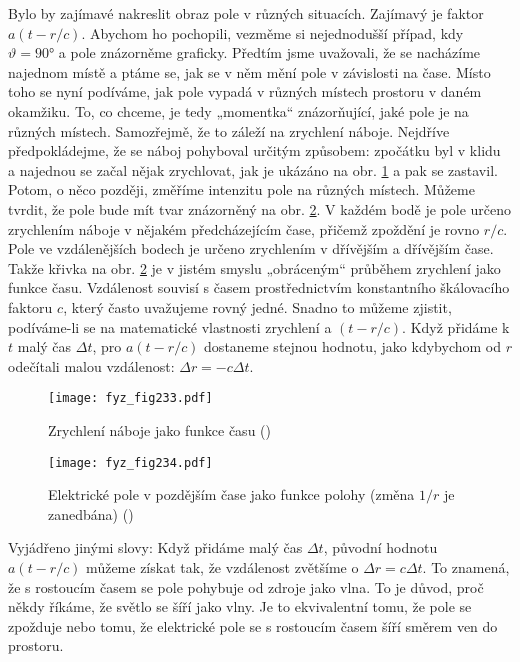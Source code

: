    Bylo by zajímavé nakreslit obraz pole v různých situacích. Zajímavý je faktor \(a(t-r/c)\). 
    Abychom ho pochopili, vezměme si nejednodušší případ, kdy \(\vartheta=\ang{90}\) a pole 
    znázorněme graficky. Předtím jsme uvažovali, že se nacházíme najednom místě a ptáme se, jak se 
    v něm mění pole v závislosti na čase. Místo toho se nyní podíváme, jak pole vypadá v různých 
    místech prostoru v daném okamžiku. To, co chceme, je tedy „momentka“ znázorňující, jaké pole je 
    na různých místech. Samozřejmě, že to záleží na zrychlení náboje. Nejdříve předpokládejme, že 
    se náboj pohyboval určitým způsobem: zpočátku byl v klidu a najednou se začal nějak zrychlovat, 
    jak je ukázáno na obr. \ref{fyz:fig233} a pak se zastavil. Potom, o něco později, změříme 
    intenzitu pole na různých místech. Můžeme tvrdit, že pole bude mít tvar znázorněný na obr. 
    \ref{fyz:fig234}. V každém bodě je pole určeno zrychlením náboje v nějakém předcházejícím čase, 
    přičemž zpoždění je rovno \(r/c\). Pole ve vzdálenějších bodech je určeno zrychlením v 
    dřívějším a dřívějším čase. Takže křivka na obr. \ref{fyz:fig234} je v jistém smyslu 
    „obráceným“ průběhem zrychlení jako funkce času. Vzdálenost souvisí s časem prostřednictvím 
    konstantního škálovacího faktoru \(c\), který často uvažujeme rovný jedné. Snadno to můžeme 
    zjistit, podíváme-li se na matematické vlastnosti zrychlení a \((t-r/c)\). Když přidáme k \(t\) 
    malý čas \(\Delta t\), pro \(a(t - r/c)\) dostaneme stejnou hodnotu, jako kdybychom od \(r\) 
    odečítali malou vzdálenost: \(\Delta r = -c\Delta t\).
    
    \begin{figure}[ht!] %
      \centering
      \texttt{[image: fyz\_fig233.pdf]}
      \caption{Zrychlení náboje jako funkce času
               (\cite[s.~380]{Feynman01})}
      \label{fyz:fig233}
    \end{figure}

    \begin{figure}[ht!] %
      \centering
      \texttt{[image: fyz\_fig234.pdf]}
      \caption{Elektrické pole v pozdějším čase jako funkce polohy (změna \(1/r\) je zanedbána)
               (\cite[s.~380]{Feynman01})}
      \label{fyz:fig234}
    \end{figure}
    
    Vyjádřeno jinými slovy: Když přidáme malý čas \(\Delta t\), původní hodnotu \(a(t - r/c)\) 
    můžeme získat tak, že vzdálenost zvětšíme o \(\Delta r = c\Delta t\). To znamená, že s 
    rostoucím časem se pole pohybuje od zdroje jako vlna. To je důvod, proč někdy říkáme, že světlo 
    se šíří jako vlny. Je to ekvivalentní tomu, že pole se zpožduje nebo tomu, že elektrické pole 
    se s rostoucím časem šíří směrem ven do prostoru. 
    
